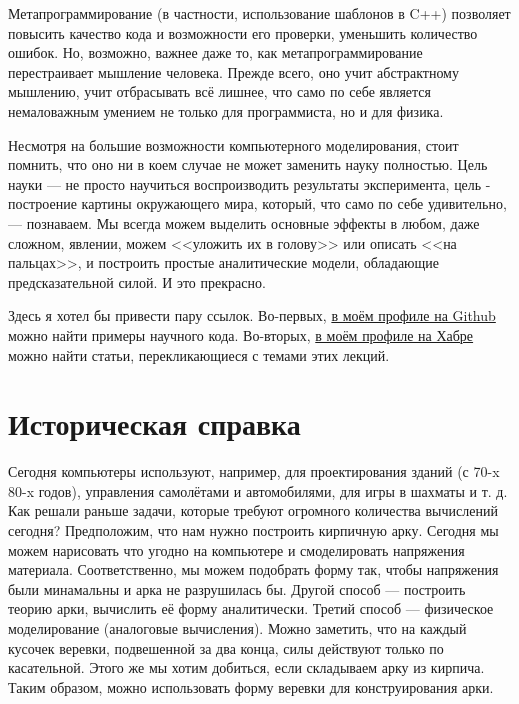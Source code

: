 \documentclass{book}
\begin{document}
Метапрограммирование (в частности, использование шаблонов в C++) позволяет повысить качество кода и
возможности его проверки, уменьшить количество ошибок. Но, возможно, важнее даже то, как
метапрограммирование перестраивает мышление человека. Прежде всего, оно учит абстрактному мышлению,
учит отбрасывать всё лишнее, что само по себе является немаловажным умением не только для
программиста, но и для физика.

Несмотря на большие возможности компьютерного моделирования, стоит помнить, что оно ни в коем
случае не может заменить науку полностью. Цель науки --- не просто научиться воспроизводить
результаты эксперимента, цель - построение картины окружающего мира, который, что само по себе
удивительно, --- познаваем. Мы всегда можем выделить основные эффекты в любом, даже сложном,
явлении, можем <<уложить их в голову>> или описать <<на пальцах>>, и построить простые
аналитические модели, обладающие предсказательной силой. И это прекрасно.

Здесь я хотел бы привести пару ссылок. Во-первых,  \href{https://github.com/EvgenyNerush}{в моём
профиле на Github} можно найти примеры научного кода. Во-вторых,
\href{https://habr.com/ru/users/271828/posts/}{в моём профиле на Хабре} можно найти статьи,
перекликающиеся с темами этих лекций.

\section{Историческая справка}

Сегодня компьютеры используют, например, для проектирования зданий (с 70-x 80-x годов), управления самолётами и
автомобилями, для игры в шахматы и т. д. Как решали раньше задачи, которые требуют огромного
количества вычислений сегодня? Предположим, что нам нужно построить кирпичную арку. Сегодня мы
можем нарисовать что угодно на компьютере и смоделировать напряжения материала. Соответственно, мы
можем подобрать форму так, чтобы напряжения были минамальны и арка не разрушилась бы. Другой способ
--- построить теорию арки, вычислить её форму аналитически. Третий способ --- физическое
моделирование (аналоговые вычисления). Можно заметить, что на каждый кусочек веревки, подвешенной
за два конца, силы действуют только по касательной. Этого же мы хотим добиться, если складываем
арку из кирпича. Таким образом, можно использовать форму веревки для конструирования арки.
\end{document}
